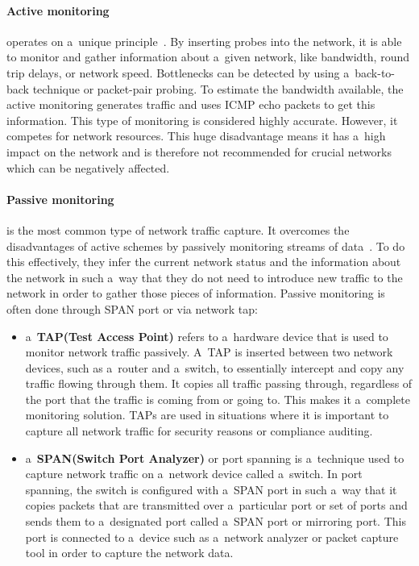 \documentclass[
  printed,     %
  color,       %
  oneside,     %
  nosansbold,  %
  nocolorbold, %
  nolof,         %
  nolot,         %
]{fithesis4}
\begin{document}
\paragraph{Active monitoring} operates on a~unique principle~\cite{landfeldt2000case}. By inserting probes into the network, it is able to monitor and gather information about a~given network, like bandwidth, round trip delays, or network speed. Bottlenecks can be detected by using a~back-to-back technique or packet-pair probing. To estimate the bandwidth available, the active monitoring generates traffic and uses ICMP echo packets to get this information. This type of monitoring is considered highly accurate. However, it competes for network resources. This huge disadvantage means it has a~high impact on the network and is therefore not recommended for crucial networks which can be negatively affected.

\paragraph{Passive monitoring} is the most common type of network traffic capture. It overcomes the disadvantages of active schemes by passively monitoring streams of data~\cite{Messier2017-fz}. To do this effectively, they infer the current network status and the information about the network in such a~way that they do not need to introduce new traffic to the network in order to gather those pieces of information. Passive monitoring is often done through SPAN port or via network tap:

\begin{itemize}
    \item a~\textbf{TAP(Test Access Point)} refers to a~hardware device that is used to monitor network traffic passively. A~TAP is inserted between two network devices, such as a~router and a~switch, to essentially intercept and copy any traffic flowing through them. It copies all traffic passing through, regardless of the port that the traffic is coming from or going to. This makes it a~complete monitoring solution. TAPs are used in situations where it is important to capture all network traffic for security reasons or compliance auditing.
    \item a~\textbf{SPAN(Switch Port Analyzer)} or port spanning is a~technique used to capture network traffic on a~network device called a~switch. In port spanning, the switch is configured with a~SPAN port in such a~way that it copies packets that are transmitted over a~particular port or set of ports and sends them to a~designated port called a~SPAN port or mirroring port. This port is connected to a~device such as a~network analyzer or packet capture tool in order to capture the network data.
\end{itemize}
\end{document}

